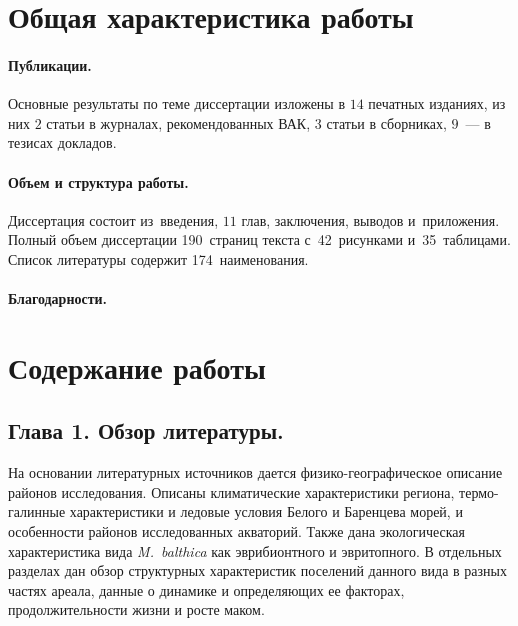 \section*{Общая характеристика работы}
\fontsize{14pt}{15pt}\selectfont


\paragraph{Публикации.} Основные результаты по теме диссертации изложены в $14$ печатных изданиях, из них $2$ статьи в журналах, рекомендованных ВАК, $3$ статьи в сборниках, $9$~--- в тезисах докладов.

\paragraph{Объем и структура работы.} Диссертация состоит из~введения, $11$ глав, заключения, выводов и~приложения. Полный объем диссертации 190~страниц текста с~42~рисунками и~35~таблицами. Список литературы содержит 174~наименования.

\paragraph{Благодарности.}
\begin{small}

\end{small}

\section*{Содержание работы}

\subsection*{Глава 1. Обзор литературы.}
На основании литературных источников дается физико-географическое описание районов исследования.
Описаны климатические характеристики региона, термо-галинные характеристики и ледовые условия Белого и Баренцева морей, и особенности районов исследованных акваторий.
Также дана экологическая характеристика вида \textit{M.~balthica} как эврибионтного и эвритопного.
В отдельных разделах дан обзор структурных характеристик поселений данного вида в разных частях ареала, данные о динамике и определяющих ее факторах, продолжительности жизни и росте маком.


